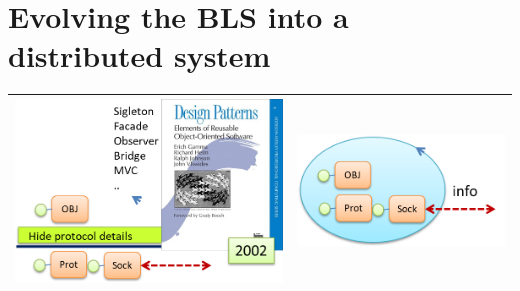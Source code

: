 \documentclass[10pt,a4paper,openright,twoside]{../llncs}
\begin{document}


\newpage
\section{Evolving the BLS into a distributed system}

 \medskip 
\begin{tabular}{|c|c|}
\hline 
\includegraphics[scale = 0.6]{img/obj1.png} &  \includegraphics[scale = 0.7]{img/obj2.png}\\
\hline 
\end{tabular}
\medskip 
 
\end{document}
